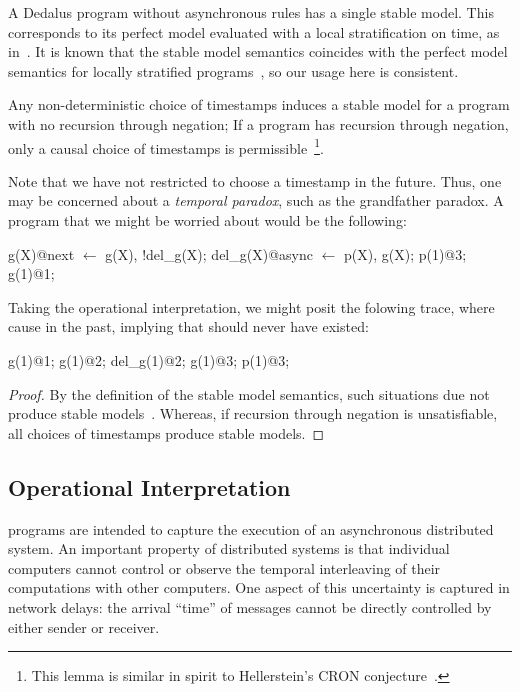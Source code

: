 A Dedalus program without asynchronous rules has a single stable model.  This corresponds to its perfect model evaluated with a local stratification on time, as in~\cite{deductiveupdates}.  It is known that the stable model semantics coincides with the perfect model semantics for locally stratified programs~\cite{stable-model}, so our usage here is consistent.


\begin{lemma}
Any non-deterministic choice of timestamps induces a stable model for a \lang program with no recursion through negation; If a \lang program has recursion through negation, only a causal choice of timestamps is permissible~\footnote{This lemma is similar in spirit to Hellerstein's CRON conjecture~\cite{declarative-imperative}.}.
\end{lemma}

Note that we have not restricted  to choose a timestamp in the future.  Thus, one may be concerned about a {\em temporal paradox}, such as the grandfather paradox.  A program that we might be worried about would be the following:

\begin{Dedalus}
g(X)@next \(\leftarrow\) g(X), !del_g(X);
del_g(X)@async \(\leftarrow\) p(X), g(X);
p(1)@3;
g(1)@1;
\end{Dedalus}

Taking the operational interpretation, we might posit the folowing trace, where  cause  in the past, implying that  should never have existed:

\begin{Dedalus}
g(1)@1;
g(1)@2;
del_g(1)@2;
g(1)@3;
p(1)@3;
\end{Dedalus}

\begin{proof}
By the definition of the stable model semantics, such situations due not produce stable models~\cite{stable-model}.  Whereas, if recursion through negation is unsatisfiable, all choices of timestamps produce stable models.
\end{proof}

\subsection{Operational Interpretation}
\lang programs are intended to capture the execution of an asynchronous distributed system.  An important property of distributed systems is that individual computers cannot control or observe the temporal interleaving of their computations with other computers.  One aspect of this uncertainty is captured in network delays: the arrival ``time'' of messages cannot be directly controlled by either sender or receiver.

